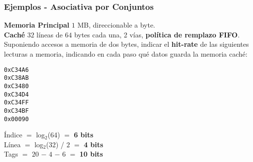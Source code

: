 \documentclass[aspectratio=169]{beamer}
\begin{document}
\begin{frame}[t]
\frametitle{Ejemplos - Asociativa por Conjuntos}
    \small
    \textbf{Memoria Principal} $1$ MB, direccionable a byte.\\
    \textbf{Caché}  $32$ l\'ineas de $64$ bytes cada una, 2 v\'ias, \textcolor{verdeuca}{\textbf{política de remplazo FIFO}}.\\ 
    \bigskip
    Suponiendo accesos a memoria de dos bytes, indicar el \textbf{hit-rate} de las siguientes lecturas a memoria, indicando en cada paso qué datos guarda la memoria caché:\\
    \begin{center}
    \texttt{0xC34A6}\\
    \texttt{0xC38AB}\\
    \texttt{0xC3480}\\
    \texttt{0xC34D4}\\
    \texttt{0xC34FF}\\
    \texttt{0xC34BF}\\
    \texttt{0x00090}
    \end{center}
    \textcolor{naranjauca}{Índice} $=$ log$_2$(64) $=$ \textbf{6 bits}\\
    \textcolor{naranjauca}{Línea} $=$ log$_2$(32) / $2$ $=$ \textbf{4 bits}\\
    \textcolor{naranjauca}{Tags} $=$ $20$ $-$ $4$ $-$ $6$ $=$ \textbf{10 bits}\\
\end{frame}
\end{document}
